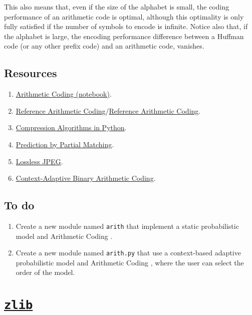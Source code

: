 This also means that, even if the size of the alphabet is small, the
coding performance of an arithmetic code is optimal, although this
optimality is only fully satisfied if the number of symbols to encode
is infinite. Notice also that, if the alphabet is large, the encoding
performance difference between a Huffman code (or any other prefix
code) and an arithmetic code, vanishes.

\subsection*{Resources}
\begin{enumerate}
\item
  \href{https://github.com/vicente-gonzalez-ruiz/arithmetic_coding/blob/master/src/arithmetic_coding/arithmetic_coding.ipynb}{Arithmetic
    Coding (notebook)}.
\item \href{https://www.nayuki.io/page/reference-arithmetic-coding}{Reference Arithmetic Coding}/\href{https://github.com/nayuki/Reference-arithmetic-coding}{Reference Arithmetic Coding}.
\item \href{https://www.inference.org.uk/mackay/python/compress/#AC}{Compression Algorithms in Python}.
\item \href{https://en.wikipedia.org/wiki/Prediction_by_partial_matching}{Prediction by Partial Matching}.
\item \href{https://en.wikipedia.org/wiki/Lossless_JPEG}{Lossless JPEG}.
\item \href{https://en.wikipedia.org/wiki/Context-adaptive_binary_arithmetic_coding}{Context-Adaptive Binary Arithmetic Coding}.
\end{enumerate}

\subsection*{To do}
\begin{enumerate}
\item Create a new module named \texttt{arith} that implement a static
  probabilistic model and Arithmetic Coding
  \cite{nelson96datacompression}.
\item Create a new module named \texttt{arith.py} that use
  a context-based adaptive probabilistic model and Arithmetic Coding
  \cite{nelson96datacompression}, where the user can select the order
  of the model.
\end{enumerate}

\section{\href{https://zlib.net/}{\texttt{zlib}}}

